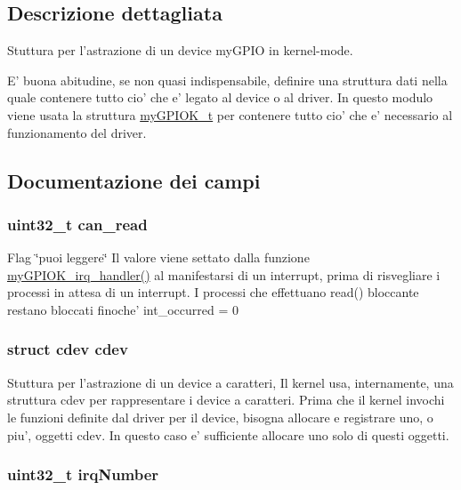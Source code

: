 \subsection{Descrizione dettagliata}
Stuttura per l'astrazione di un device my\+G\+P\+I\+O in kernel-\/mode. 

E' buona abitudine, se non quasi indispensabile, definire una struttura dati nella quale contenere tutto cio' che e' legato al device o al driver. In questo modulo viene usata la struttura \hyperlink{structmy_g_p_i_o_k__t}{my\+G\+P\+I\+O\+K\+\_\+t} per contenere tutto cio' che e' necessario al funzionamento del driver. 

\subsection{Documentazione dei campi}
\hypertarget{structmy_g_p_i_o_k__t_a2b8d3d6037e2d2fdadbd7c2fd995f0a1}{
\subsubsection[{can\+\_\+read}]{\setlength{\rightskip}{0pt plus 5cm}uint32\+\_\+t can\+\_\+read}}\label{structmy_g_p_i_o_k__t_a2b8d3d6037e2d2fdadbd7c2fd995f0a1}
Flag \char`\"{}puoi leggere\char`\"{} Il valore viene settato dalla funzione \hyperlink{group___linux-_driver_ga2fc230a12a97aa63e43b2dc4aec73511}{my\+G\+P\+I\+O\+K\+\_\+irq\+\_\+handler()} al manifestarsi di un interrupt, prima di risvegliare i processi in attesa di un interrupt. I processi che effettuano read() bloccante restano bloccati finoche' int\+\_\+occurred = 0 \hypertarget{structmy_g_p_i_o_k__t_acba682fe45d5a1501790dbdb1d99bd6a}{
\subsubsection[{cdev}]{\setlength{\rightskip}{0pt plus 5cm}struct cdev cdev}}\label{structmy_g_p_i_o_k__t_acba682fe45d5a1501790dbdb1d99bd6a}
Stuttura per l'astrazione di un device a caratteri, Il kernel usa, internamente, una struttura cdev per rappresentare i device a caratteri. Prima che il kernel invochi le funzioni definite dal driver per il device, bisogna allocare e registrare uno, o piu', oggetti cdev. In questo caso e' sufficiente allocare uno solo di questi oggetti. \hypertarget{structmy_g_p_i_o_k__t_a42a1593ebe61611c4e29413903a373a5}{
\subsubsection[{irq\+Number}]{\setlength{\rightskip}{0pt plus 5cm}uint32\+\_\+t irq\+Number}}\label{structmy_g_p_i_o_k__t_a42a1593ebe61611c4e29413903a373a5}
